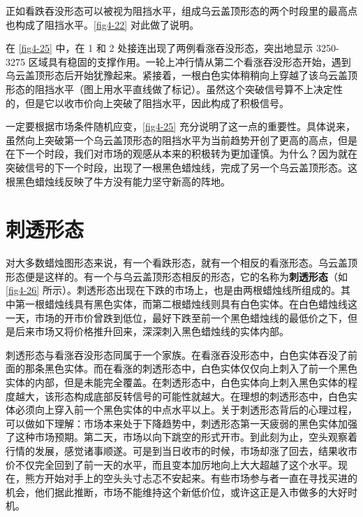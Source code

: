 正如看跌吞没形态可以被视为阻挡水平，组成乌云盖顶形态的两个时段里的最高点也构成了阻挡水平。\autoref{fig4-22} 对此做了说明。

在 \autoref{fig4-25} 中，在 1 和 2 处接连出现了两例看涨吞没形态，突出地显示 3250-3275 区域具有稳固的支撑作用。一轮上冲行情从第二个看涨吞没形态开始，遇到乌云盖顶形态后开始犹豫起来。紧接着，一根白色实体稍稍向上穿越了该乌云盖顶形态的阻挡水平（图上用水平直线做了标记）。虽然这个突破信号算不上决定性的，但是它以收市价向上突破了阻挡水平，因此构成了积极信号。

一定要根据市场条件随机应变，\autoref{fig4-25} 充分说明了这一点的重要性。具体说来，虽然向上突破第一个乌云盖顶形态的阻挡水平为当前趋势开创了更高的高点，但是在下一个时段，我们对市场的观感从本来的积极转为更加谨慎。为什么？因为就在突破信号的下一个时段，出现了一根黑色蜡烛线，完成了另一个乌云盖顶形态。这根黑色蜡烛线反映了牛方没有能力坚守新高的阵地。


\section{刺透形态}
对大多数蜡烛图形态来说，有一个看跌形态，就有一个相反的看涨形态。乌云盖顶形态便是这样的。有一个与乌云盖顶形态相反的形态，它的名称为\textbf{刺透形态}（如 \autoref{fig4-26} 所示）。刺透形态出现在下跌的市场上，也是由两根蜡烛线所组成的。其中第一根蜡烛线具有黑色实体，而第二根蜡烛线则具有白色实体。在白色蜡烛线这一天，市场的开市价曾跌到低位，最好下跌至前一个黑色蜡烛线的最低价之下，但是后来市场又将价格推升回来，深深刺入黑色蜡烛线的实体内部。


刺透形态与看涨吞没形态同属于一个家族。在看涨吞没形态中，白色实体吞没了前面的那条黑色实体。而在看涨的刺透形态中，白色实体仅仅向上刺入了前一个黑色实体的内部，但是未能完全覆盖。在刺透形态中，白色实体向上刺入黑色实体的程度越大，该形态构成底部反转信号的可能性就越大。在理想的刺透形态中，白色实体必须向上穿入前一个黑色实体的中点水平以上。关于刺透形态背后的心理过程，可以做如下理解：市场本来处于下降趋势中，刺透形态第一天疲弱的黑色实体加强了这种市场预期。第二天，市场以向下跳空的形式开市。到此刻为止，空头观察着行情的发展，感觉诸事顺遂。可是到当日收市的时候，市场却涨了回去，结果收市价不仅完全回到了前一天的水平，而且变本加厉地向上大大超越了这个水平。现在，熊方开始对手上的空头头寸忐忑不安起来。有些市场参与者一直在寻找买进的机会，他们据此推断，市场不能维持这个新低价位，或许这正是入市做多的大好时机。

